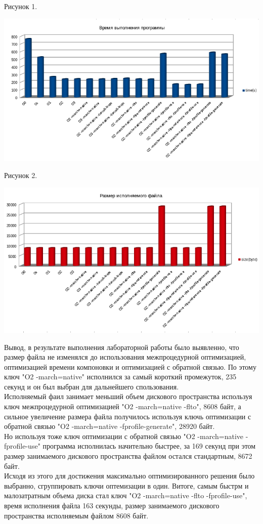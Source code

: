 \documentclass[12pt,a4paper]{scrartcl}
\begin{document}
\begin{center}
\parindent=1cm
\caption{Рисунок 1.}
\includegraphics[width=\linewidth]{time.PNG}
\newpage
\caption{Рисунок 2.}
\includegraphics[width=\linewidth]{size.PNG}
\end{center}
\par
Вывод, в результате выполнения лабораторной работы было выявленно, 
что размер файла не изменялся до использования межпроцедурной
оптимизацией, оптимизацией времени компоновки и оптимизацией с обратной
связью. По этому ключ "O2 -march=native" исполнился за самый короткий промежуток, 235 секунд и он был выбран для дальнейшего спользования. \\
Исполняемый фаил занимает меньший объем дискового пространства используя ключ межпроцедурной
оптимизацией "O2 -march=native -flto", 8608 байт, а сильное увеличение размера файла получилось используя ключь оптимизации с
обратной связью "O2 -march=native -fprofile-generate", 28920 байт. \\
Но используя тоже ключ оптимизации с обратной связью "O2 -march=native -fprofile-use" программа исполнилась начительно быстрее, за 169 секунд при этом размер занимаемого дискового пространства файлом остался стандартным, 8672 байт.\\
Исходя из этого для достижения максимально оптимизированного решения было выбранно, сгруппировать ключи оптемизации в один.
Витоге, самым быстрм и малозатратным объема диска стал ключ "O2 -march=native -flto -fprofile-use", время исполнения файла 163 секунды, размер занимаемого дискового пространства исполняемым файлом 8608 байт.
\end{document}
